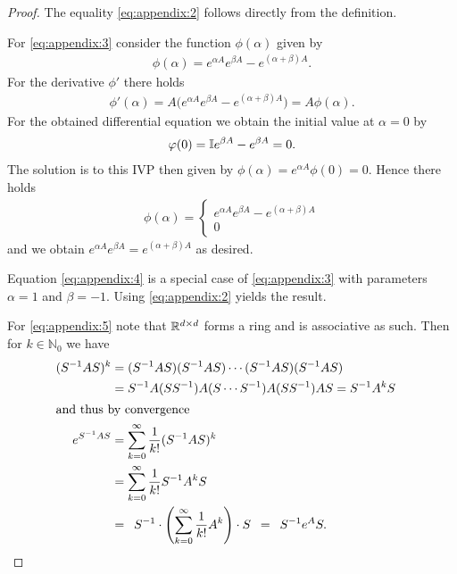 \begin{proof}
	The equality \ref{eq:appendix:2} follows directly from the definition.
    
    For \ref{eq:appendix:3} consider the function $\phi(\alpha)$ given by
    \begin{gather*}
	\phi(\alpha) = e^{\alpha A}e^{\beta A} - e^{(\alpha + \beta) A}.
	\end{gather*}
    For the derivative $\phi '$ there holds
    \begin{gather*}
	\phi'(\alpha) = A\big(e^{\alpha A}e^{\beta A}
		- e^{(\alpha + \beta) A} \big) = A \phi(\alpha).
	\end{gather*}
    For the obtained differential equation we obtain the initial value at
	$\alpha = 0$ by
    \begin{gather*}
	\varphi(0) = \mathbb I e^{\beta A} - e^{\beta A} = 0.
	\end{gather*}
    The solution is to this IVP then given by $\phi(\alpha) = e^{\alpha A}
		\phi(0) = 0$. Hence there holds
    \begin{gather*}
	\phi(\alpha) = \begin{cases}
	 e^{\alpha A}e^{\beta A} - e^{(\alpha + \beta) A} \\
     0
	\end{cases}
	\end{gather*}
    and we obtain $e^{\alpha A}e^{\beta A} = e^{(\alpha + \beta) A}$
		as desired.
    
    Equation \ref{eq:appendix:4} is a special case of \ref{eq:appendix:3}
	with parameters $\alpha=1$ and $\beta = -1$. Using \ref{eq:appendix:2}
	yields the result.
    
    For \ref{eq:appendix:5} note that $\mathbb R^{d \times d}$ forms a ring and is
	associative as such. Then for $k \in \mathbb N_0$ we have
    \begin{align*}
	(S^{-1} AS)^k &= (S^{-1} AS) (S^{-1} AS) \cdots (S^{-1} AS)(S^{-1} AS) \\
		&= S^{-1} A (SS^{-1}) A (S \cdots S^{-1}) A (SS^{-1}) AS = S^{-1} A^k S& \\
			\intertext{and thus by convergence}
	e^{S^{-1}AS} &= \sum_{k=0}^\infty \frac{1}{k!} (S^{-1}AS)^k \\
		&= \sum_{k=0}^\infty\frac{1}{k!} S^{-1} A^k S \\
		&= \enskip S^{-1} \cdot \left( \sum_{k=0}^\infty \frac{1}{k!} A^k \right)
			\cdot S  \enskip =  \enskip S^{-1} e^A S.&
	\end{align*}
    

\end{proof}
